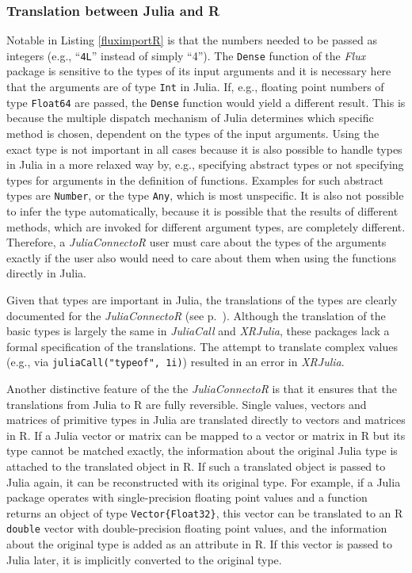 \documentclass[12pt]{article}
\newcommand{\inlinecode}[1]{\texttt{#1}}
\newcommand{\apkg}[1]{\emph{#1}}
\begin{document}
\subsubsection{Translation between Julia and R}\label{translatejuliar}
Notable in Listing \ref{fluximportR} is that the numbers needed to be passed as integers (e.g., ``\inlinecode{4L}'' instead of simply ``4'').
The \inlinecode{Dense} function of the \apkg{Flux} package is sensitive to the types of its input arguments and it is necessary here that the arguments are of type \inlinecode{Int} in Julia.
If, e.g., floating point numbers of type \inlinecode{Float64} are passed, the \inlinecode{Dense} function would yield a different result.
This is because the multiple dispatch mechanism of Julia determines which specific method is chosen, dependent on the types of the input arguments.
Using the exact type is not important in all cases because it is also possible to handle types in Julia in a more relaxed way by, e.g., specifying abstract types or not specifying types for arguments in the definition of functions.
Examples for such abstract types are \inlinecode{Number}, or the type \inlinecode{Any}, which is most unspecific.
It is also not possible to infer the type automatically, because it is possible that the results of different methods, which are invoked for different argument types, are completely different.
Therefore, a \apkg{JuliaConnectoR} user must care about the types of the arguments exactly if the user also would need to care about them when using the functions directly in Julia.

Given that types are important in Julia, the translations of the types are clearly documented for the \apkg{JuliaConnectoR} (see p.~\pageref{juliaconnectordokutypetranslation}).
Although the translation of the basic types is largely the same in \apkg{JuliaCall} and \apkg{XRJulia}, these packages lack a formal specification of the translations.
The attempt to translate complex values (e.g., via \inlinecode{juliaCall("typeof", 1i)}) resulted in an error in \apkg{XRJulia}.

Another distinctive feature of the the \apkg{JuliaConnectoR} is that it ensures that the translations from Julia to R are fully reversible.
Single values, vectors and matrices of primitive types in Julia are translated directly to vectors and matrices in R.
If a Julia vector or matrix can be mapped to a vector or matrix in R but its type cannot be matched exactly, the information about the original Julia type is attached to the translated object in R.
If such a translated object is passed to Julia again, it can be reconstructed with its original type.
For example, if a Julia package operates with single-precision floating point values and a function returns an object of type \inlinecode{Vector\{Float32\}}, this vector can be translated to an R \inlinecode{double} vector with double-precision floating point values, and the information about the original type is added as an attribute in R.
If this vector is passed to Julia later, it is implicitly converted to the original type.
\end{document}
